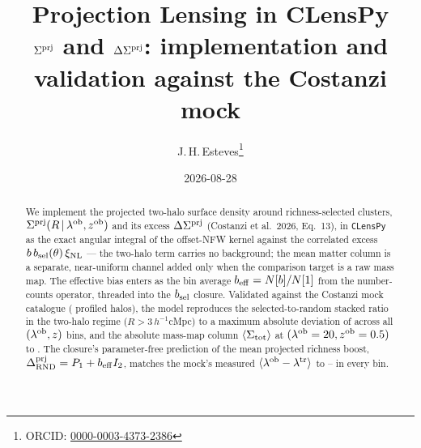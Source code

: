 \documentclass[a4paper, 11pt]{article}
\title{\vspace{-4ex}\huge \textbf{Projection Lensing in CLensPy}\\[0.5ex]
       \Large \textbf{$\Sprj$ and $\DSprj$: implementation and validation
       against the Costanzi mock}}
\author{J.\,H.\,Esteves\thanks{ORCID:
  \href{https://orcid.org/0000-0003-4373-2386}{0000-0003-4373-2386}}}
\date{2026-08-28}
\newcommand{\modname}[1]{\textcolor{kwcol}{\texttt{#1}}}
\newcommand{\lob}{\lambda^{\rm ob}}
\newcommand{\ltr}{\lambda^{\rm tr}}
\newcommand{\zob}{z^{\rm ob}}
\newcommand{\Sprj}{\Sigma^{\rm prj}}
\newcommand{\Stot}{\Sigma_{\rm tot}}
\newcommand{\DSprj}{\Delta\Sigma^{\rm prj}}
\newcommand{\bsel}{b_{\rm sel}}
\newcommand{\beff}{b_{\rm eff}}
\newcommand{\xinl}{\xi_{\rm NL}}
\begin{document}
\maketitle

\begin{abstract}
We implement the projected two-halo surface density around
richness-selected clusters, $\Sprj(R\,|\,\lob,\zob)$ and its excess
$\DSprj$ (Costanzi et al.\ 2026, Eq.~13), in \modname{CLensPy} as the
exact angular integral of the offset-NFW kernel against the correlated
excess $b\,\bsel(\theta)\,\xinl$ --- the two-halo term carries no
background; the mean matter column is a separate, near-uniform channel
added only when the comparison target is a raw mass map. The effective bias enters as the bin average
$\beff = N[b]/N[1]$ from the number-counts operator, threaded into the
$\bsel$ closure. Validated against the Costanzi mock catalogue
(\NHalosProfiled{} profiled halos), the model reproduces the
selected-to-random stacked ratio in the two-halo regime
($R > 3\,h^{-1}$cMpc) to a maximum absolute deviation of
\MaxTwoHaloResid{} across all \NBins{} $(\lob, z)$ bins, and the absolute
mass-map column $\langle\Stot\rangle$ at $(\lob = 20, \zob = 0.5)$ to
\LegCMaxDev{}. The
closure's parameter-free prediction of the mean projected richness
boost, $\Delta^{\rm prj}_{\rm RND} = P_1 + \beff I_2$, matches the
mock's measured $\langle\lob - \ltr\rangle$ to \DeltaPrjAgreeMin{}--%
\DeltaPrjAgreeMax{} in every bin.
\end{abstract}

\tableofcontents





\end{document}
